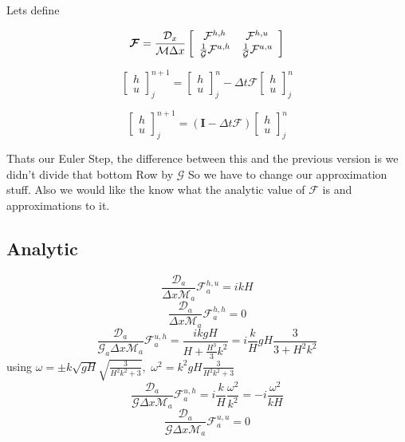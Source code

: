 \documentclass[12pt]{article}
\begin{document}
Lets define

\[\boldsymbol{\mathcal{F}} = \frac{\mathcal{D}_x}{\mathcal{M}\Delta x}\left[\begin{array}{c c}
\mathcal{F}^{h,h} & \mathcal{F}^{h,u} \\ \frac{1}{\mathcal{G}}\mathcal{F}^{u,h} &  \frac{1}{\mathcal{G}}\mathcal{F}^{u,u} 
\end{array}\right] \]

\[\left[\begin{array}{c}
h \\ u
\end{array}\right]^{n+1}_j = \left[\begin{array}{c}
h \\ u
\end{array}\right]^{n}_j - \Delta t\boldsymbol{\mathcal{F}}\left[\begin{array}{c}
h \\ u
\end{array}\right]^{n}_j  \]

\[\left[\begin{array}{c}
h \\ u
\end{array}\right]^{n+1}_j = \left(\boldsymbol{I} - \Delta t\boldsymbol{\mathcal{F}} \right)\left[\begin{array}{c}
h \\ u
\end{array}\right]^{n}_j  \]

Thats our Euler Step, the difference between this and the previous version is we didn't divide that bottom Row by $\mathcal{G}$ So we have to change our approximation stuff. Also we would like the know what the analytic value of $\boldsymbol{\mathcal{F}}$ is and approximations to it. 

\subsection{Analytic}

\[\frac{\mathcal{D}_a}{\Delta x\mathcal{M}_a}\mathcal{F}^{h,u}_a = ikH\]
\[\frac{\mathcal{D}_a}{\Delta x\mathcal{M}_a}\mathcal{F}^{h,h}_a = 0\]
\[\frac{\mathcal{D}_a}{\mathcal{G}_a\Delta x\mathcal{M}_a}\mathcal{F}^{u,h}_a = \frac{ikgH}{H + \frac{H^3}{3}k^2} = i\frac{k}{H} gH \frac{3}{3 + H^2k^2} \]
using $\omega = \pm k \sqrt{gH}\sqrt{\frac{3}{H^2k^2 + 3}}, $ $\omega^2 =  k^2 gH\frac{3}{H^2k^2 + 3}$
\[\frac{\mathcal{D}_a}{\mathcal{G}\Delta x\mathcal{M}_a}\mathcal{F}^{u,h}_a = i\frac{k}{H} \frac{\omega^2}{k^2}  = -i \frac{\omega^2}{kH}\]
\[\frac{\mathcal{D}_a}{\mathcal{G}\Delta x\mathcal{M}_a}\mathcal{F}^{u,u}_a = 0\]
\end{document}
